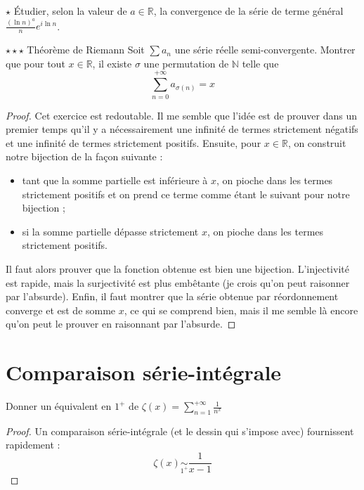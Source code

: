 \documentclass[french,a4paper]{article}
\newcommand{\N}{\mathbb{N}}
\newcommand{\R}{\mathbb{R}}
\theoremstyle{plain}
\theoremstyle{definition}
\theoremstyle{remark}
\begin{document}
\begin{ex}{$\star$}
	Étudier, selon la valeur de $a\in\R$, la convergence de la série de terme général $\displaystyle\frac{(\ln n)^a}{n}e^{i\ln n}$.
\end{ex}

\begin{ex}[X]{$\star\star\star$ Théorème de Riemann}
	Soit $\sum a_n$ une série réelle semi-convergente. Montrer que pour tout $x \in \R$, il existe $\sigma$ une permutation de $\N$ telle que $$\sum_{n=0}^{+\infty} a_{\sigma(n)}=x $$
\end{ex}
\begin{proof}
	Cet exercice est redoutable. Il me semble que l'idée est de prouver dans un premier temps qu'il y a nécessairement une infinité de termes strictement négatifs et une infinité de termes strictement positifs. Ensuite, pour $x\in\R$, on construit notre bijection de la façon suivante :
	\begin{itemize}
		\item tant que la somme partielle est inférieure à $x$, on pioche dans les termes strictement positifs et on prend ce terme comme étant le suivant pour notre bijection ;
		\item si la somme partielle dépasse strictement $x$, on pioche dans les termes strictement positifs.
	\end{itemize}
	Il faut alors prouver que la fonction obtenue est bien une bijection. L'injectivité est rapide, mais la surjectivité est plus embêtante (je crois qu'on peut raisonner par l'absurde). Enfin, il faut montrer que la série obtenue par réordonnement converge et est de somme $x$, ce qui se comprend bien, mais il me semble là encore qu'on peut le prouver en raisonnant par l'absurde.
\end{proof}
\section{Comparaison série-intégrale}

\begin{ex}{}
	Donner un équivalent en $1^+$ de $\displaystyle\zeta(x)=\sum_{n=1}^{+\infty}\frac{1}{n^x}$
\end{ex}
\begin{proof}
	Un comparaison série-intégrale (et le dessin qui s'impose avec) fournissent rapidement : $$\zeta(x)\underset{1^+}{\sim}\frac{1}{x-1}$$
\end{proof}
\end{document}
